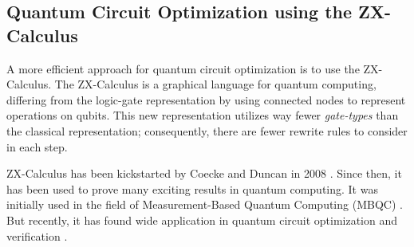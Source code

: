 \subsection{Quantum Circuit Optimization using the ZX-Calculus}

A more efficient approach for quantum circuit optimization is to use the ZX-Calculus. The ZX-Calculus is a graphical language for quantum computing, differing from the logic-gate representation by using connected nodes to represent operations on qubits. This new representation utilizes way fewer \textit{gate-types} than the classical representation; consequently, there are fewer rewrite rules to consider in each step.

ZX-Calculus has been kickstarted by Coecke and Duncan in 2008 \cite{Coecke2007graphicalcalculus}. Since then, it has been used to prove many exciting results in quantum computing. It was initially used in the field of Measurement-Based Quantum Computing (MBQC) \cite{duncan2012graphical}. But recently, it has found wide application in quantum circuit optimization and verification \cite{vandewetering2020zxcalculus}.